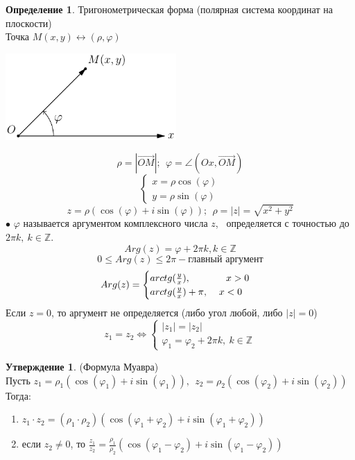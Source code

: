 \documentclass[a4paper, 12pt]{article}
\newcommand{\Z}{\mathbb Z}
\renewcommand{\phi}{\varphi}
\newcommand\tab[1][.5cm]{\hspace*{#1}}
\theoremstyle{definition}
\newtheorem*{definition}{Определение}
\newtheorem*{subtheorem}{Утверждение}
\begin{document}
  \begin{definition}
    Тригонометрическая форма (полярная система координат на плоскости) \\
    Точка $M(x, y) \longleftrightarrow (\rho, \phi)$
    \begin{center}
      \includegraphics[width=6.5cm]{image/lecture-19.pdf}
    \end{center}
    $$\rho = |\overrightarrow{OM}|; \ \ \phi = \angle(Ox, \overrightarrow{OM})$$
    $$\begin{cases}
      x = \rho \cos(\phi)\\
      y = \rho \sin(\phi)
    \end{cases}$$ 
    $$z = \rho(\cos(\phi)+i\sin(\phi)); \ \ 
    \rho = |z| = \sqrt{x^2+y^2}$$
    $\bullet$ $\phi$ называется аргументом комплексного числа $z$, \ определяется с точностью до $2\pi k, \ k \in \Z$.
    $$Arg(z) = \phi + 2 \pi k, k \in \Z$$
    $$0\leq Arg(z)\leq2\pi - \text{главный аргумент}$$
    $$Arg(z) = \begin{cases}
      arctg(\frac{y}{x}), \tab[1.3cm] x>0 \\
      arctg(\frac{y}{x})+\pi, \tab[0.4cm] x<0
    \end{cases}$$ 
    Если $z = 0$, то аргумент не определяется (либо угол любой, либо $|z| = 0$)
    $$z_1 = z_2 \Longleftrightarrow \begin{cases}
      |z_1| = |z_2| \\
      \phi_1 = \phi_2 + 2\pi k, \ k\in \Z
    \end{cases}$$ 
  \end{definition} 
  \begin{subtheorem} (Формула Муавра)\\
    Пусть $z_1 = \rho_1(\cos(\phi_1) + i\sin(\phi_1)), \ \ z_2 = \rho_2(\cos(\phi_2) + i\sin(\phi_2))$ \\
    Тогда:
    \begin{enumerate}
      \item $z_1 \cdot z_2 = (\rho_1 \cdot \rho_2)(\cos(\phi_1+\phi_2) + i\sin(\phi_1+\phi_2))$
      \item если $z_2 \neq 0$, то $\frac{z_1}{z_2} = \frac{\rho_1}{\rho_2} (\cos(\phi_1-\phi_2) + i\sin(\phi_1-\phi_2))$  
    \end{enumerate}
  \end{subtheorem} 
\end{document}

